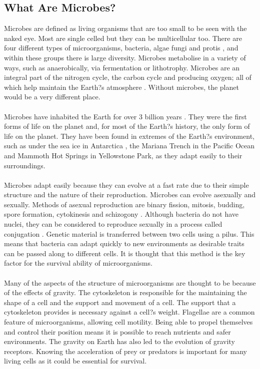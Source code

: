 \documentclass[12pt]{article}
\begin{document}
\subsection{What Are Microbes?}
Microbes are defined as living organisms that are too small to be seen with the naked eye. Most are single celled but they can be multicellular too. There are four different types of microorganisms, bacteria, algae fungi and protis , and within these groups there is large diversity. Microbes metabolise in a variety of ways, such as anaerobically, via fermentation or lithotrophy.  Microbes are an integral part of the nitrogen cycle, the carbon cycle and producing oxygen; all of which help maintain the Earth?s atmosphere . Without microbes, the planet would be a very different place.
\\
\\
Microbes have inhabited the Earth for over 3 billion years . They were the first forms of life on the planet and, for most of the Earth?s history, the only form of life on the planet. They have been found in extremes of the Earth?s environment, such as under the sea ice in Antarctica , the Mariana Trench in the Pacific Ocean  and Mammoth Hot Springs in Yellowstone Park, as they adapt easily to their surroundings. 
\\
\\
Microbes adapt easily because they can evolve at a fast rate due to their simple structure and the nature of their reproduction. Microbes can evolve asexually and sexually. Methods of asexual reproduction are binary fission, mitosis, budding, spore formation, cytokinesis and schizogony . Although bacteria do not have nuclei, they can be considered to reproduce sexually in a process called conjugation . Genetic material is transferred between two cells using a pilus. This means that bacteria can adapt quickly to new environments as desirable traits can be passed along to different cells. It is thought that this method is the key factor for the survival ability of microorganisms.  
\\
\\Many of the aspects of the structure of microorganisms are thought to be because of the effects of gravity. The cytoskeleton is responsible for the maintaining the shape of a cell and the support and movement of a cell. The support that a cytoskeleton provides is necessary against a cell?s weight.  Flagellae are a common feature of microorganisms, allowing cell motility. Being able to propel themselves and control their position means it is possible to reach nutrients and safer environments.  The gravity on Earth has also led to the evolution of gravity receptors. Knowing the acceleration of prey or predators is important for many living cells as it could be essential for survival.   
\end{document}
